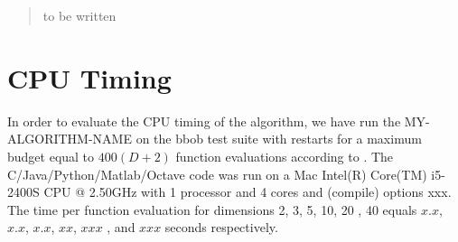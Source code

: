 \documentclass{sig-alternate}
\newcommand{\change}[1]{{\color{red} #1}}
\begin{document}

\maketitle
\begin{abstract}
to be written
\end{abstract}




%
%
%
\section{CPU Timing}
In order to evaluate the CPU timing of the algorithm, we have run the \change{MY-ALGORITHM-NAME} on the  \change{bbob test suite \cite{hansen2009fun}} with restarts for a maximum budget equal to \change{$400 (D + 2)$} function evaluations according to \cite{hansen2016exp}. The \change{C/Java/Python/Matlab/Octave} code was run on a \change{Mac Intel(R) Core(TM) i5-2400S CPU @ 2.50GHz} with \change{1} processor and \change{4} cores \change{and (compile) options xxx}. The time per function evaluation for dimensions 2, 3, 5, 10, 20\change{, 40} equals \change{$x.x$}, \change{$x.x$}, \change{$x.x$}, \change{$xx$}, \change{$xxx$}\change{, and $xxx$} seconds respectively. 
\end{document}
